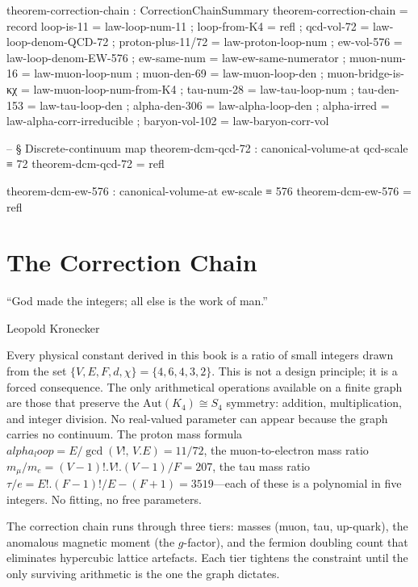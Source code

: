 \documentclass[11pt,a4paper]{book}
\def\alpha{alpha}%
\def\cdot{.}%
\def\mathrm#1{#1}%
\begin{document}
\begin{code}
theorem-correction-chain : CorrectionChainSummary
theorem-correction-chain = record
  { loop-is-11        = law-loop-num-11
  ; loop-from-K4      = refl
  ; qcd-vol-72        = law-loop-denom-QCD-72
  ; proton-plus-11/72 = law-proton-loop-num
  ; ew-vol-576        = law-loop-denom-EW-576
  ; ew-same-num       = law-ew-same-numerator
  ; muon-num-16       = law-muon-loop-num
  ; muon-den-69       = law-muon-loop-den
  ; muon-bridge-is-κχ = law-muon-loop-num-from-K4
  ; tau-num-28        = law-tau-loop-num
  ; tau-den-153       = law-tau-loop-den
  ; alpha-den-306     = law-alpha-loop-den
  ; alpha-irred       = law-alpha-corr-irreducible
  ; baryon-vol-102    = law-baryon-corr-vol
  }

-- § Discrete-continuum map
theorem-dcm-qcd-72 : canonical-volume-at qcd-scale ≡ 72
theorem-dcm-qcd-72 = refl

theorem-dcm-ew-576 : canonical-volume-at ew-scale ≡ 576
theorem-dcm-ew-576 = refl
\end{code}

\chapter{The Correction Chain}
\label{ch:correction-chain}

\epigraph{``God made the integers; all else is the work of man.''}{Leopold Kronecker}

Every physical constant derived in this book is a ratio of small integers drawn from the set $\{V, E, F, d, \chi\} = \{4, 6, 4, 3, 2\}$. This is not a design principle; it is a forced consequence. The only arithmetical operations available on a finite graph are those that preserve the $\textrm{Aut}(K_4) \cong S_4$ symmetry: addition, multiplication, and integer division. No real-valued parameter can appear because the graph carries no continuum. The proton mass formula $\alpha_\mathrm{loop} = E / \gcd(V!,\, V \cdot E) = 11/72$, the muon-to-electron mass ratio $m_\mu / m_e = (V-1)! \cdot V! \cdot (V-1) / F = 207$, the tau mass ratio $\tau / e = E! \cdot (F-1)! / E - (F+1) = 3519$---each of these is a polynomial in five integers. No fitting, no free parameters.

The correction chain runs through three tiers: masses (muon, tau, up-quark), the anomalous magnetic moment (the $g$-factor), and the fermion doubling count that eliminates hypercubic lattice artefacts. Each tier tightens the constraint until the only surviving arithmetic is the one the graph dictates.
\end{document}
